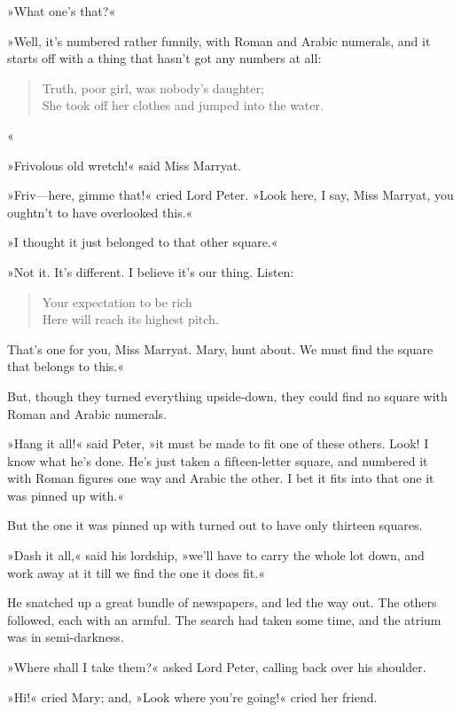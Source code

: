»What one's that?«

»Well, it's numbered rather funnily, with Roman and Arabic numerals, and it starts off with a thing that hasn't got any numbers at all:

\begin{verse}
Truth, poor girl, was nobody's daughter;\\
She took off her clothes and jumped into the water.\\
\end{verse}
«

»Frivolous old wretch!« said Miss Marryat.

»Friv—here, gimme that!« cried Lord Peter. »Look here, I say, Miss Marryat, you oughtn't to have overlooked this.«

»I thought it just belonged to that other square.«

»Not it. It's different. I believe it's our thing. Listen:

\begin{verse}
Your expectation to be rich\\
Here will reach its highest pitch.\\
\end{verse}

That's one for you, Miss Marryat. Mary, hunt about. We must find the square that belongs to this.«

But, though they turned everything upside-down, they could find no square with Roman and Arabic numerals.

»Hang it all!« said Peter, »it must be made to fit one of these others. Look! I know what he's done. He's just taken a fifteen-letter square, and numbered it with Roman figures one way and Arabic the other. I bet it fits into that one it was pinned up with.«

But the one it was pinned up with turned out to have only thirteen squares.

»Dash it all,« said his lordship, »we'll have to carry the whole lot down, and work away at it till we find the one it does fit.«

He snatched up a great bundle of newspapers, and led the way out. The others followed, each with an armful. The search had taken some time, and the atrium was in semi-darkness.

»Where shall I take them?« asked Lord Peter, calling back over his shoulder.

»Hi!« cried Mary; and, »Look where you're going!« cried her friend.

